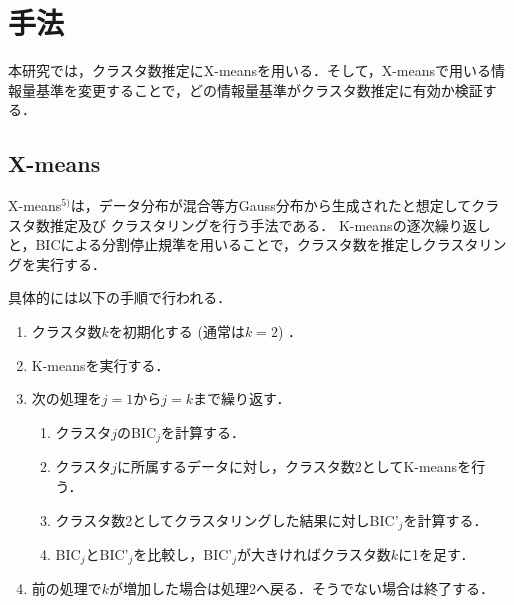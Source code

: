 \section{手法}

本研究では，クラスタ数推定にX-meansを用いる．そして，X-meansで用いる情報量基準を変更することで，どの情報量基準がクラスタ数推定に有効か検証する．

\subsection{X-means}
X-means$^{5)}$は，データ分布が混合等方Gauss分布から生成されたと想定してクラスタ数推定及び
クラスタリングを行う手法である．
K-meansの逐次繰り返しと，BICによる分割停止規準を用いることで，クラスタ数を推定しクラスタリングを実行する．

具体的には以下の手順で行われる．
\begin{enumerate}
    \item クラスタ数$k$を初期化する (通常は$k=2$) ．
    \item K-meansを実行する．
    \item 次の処理を$j=1$から$j=k$まで繰り返す．
    \begin{enumerate}
        \item クラスタ$j$のBIC$_j$を計算する．
        \item クラスタ$j$に所属するデータに対し，クラスタ数2としてK-meansを行う．
        \item クラスタ数2としてクラスタリングした結果に対しBIC'$_j$を計算する．
        \item BIC$_j$とBIC'$_j$を比較し，BIC'$_j$が大きければクラスタ数$k$に1を足す．
    \end{enumerate}
    \item 前の処理で$k$が増加した場合は処理2へ戻る．そうでない場合は終了する．
\end{enumerate}

